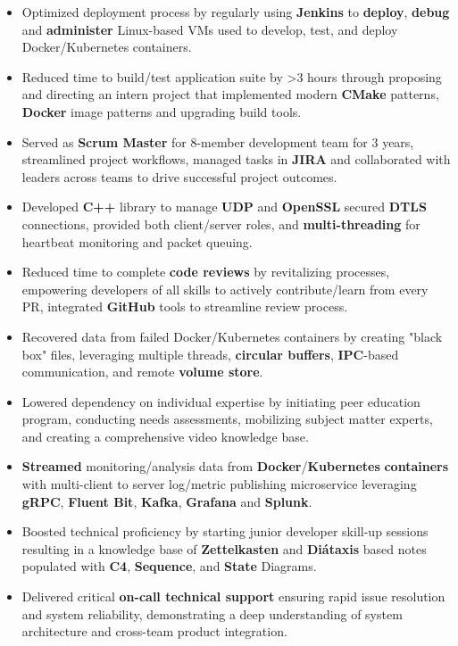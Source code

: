 \documentclass[a4paper]{article}
\begin{document}
\begin{itemize}
	\item Optimized deployment process by regularly using \textbf{Jenkins} to \textbf{deploy}, \textbf{debug} and \textbf{administer} Linux-based VMs used to develop, test, and deploy Docker/Kubernetes containers.
	\item Reduced time to build/test application suite by >3 hours through proposing and directing an intern project that implemented modern \textbf{CMake} patterns, \textbf{Docker} image patterns and upgrading build tools.
	\item Served as \textbf{Scrum Master} for 8-member development team for 3 years, streamlined project workflows, managed tasks in \textbf{JIRA} and collaborated with leaders across teams to drive successful project outcomes.
	\item Developed \textbf{C++} library to manage \textbf{UDP} and \textbf{OpenSSL} secured \textbf{DTLS} connections, provided both client/server roles, and \textbf{multi-threading} for heartbeat monitoring and packet queuing.
	\item Reduced time to complete \textbf{code reviews} by revitalizing processes, empowering developers of all skills to actively contribute/learn from every PR, integrated \textbf{GitHub} tools to streamline review process.
	\item Recovered data from failed Docker/Kubernetes containers by creating "black box" files, leveraging multiple threads, \textbf{circular buffers}, \textbf{IPC}-based communication, and remote \textbf{volume store}.
	\item Lowered dependency on individual expertise by initiating peer education program, conducting needs assessments, mobilizing subject matter experts, and creating a comprehensive video knowledge base.
	\item \textbf{Streamed} monitoring/analysis data from \textbf{Docker}/\textbf{Kubernetes} \textbf{containers} with multi-client to server log/metric publishing microservice leveraging \textbf{gRPC}, \textbf{Fluent Bit}, \textbf{Kafka}, \textbf{Grafana} and \textbf{Splunk}.
	\item Boosted technical proficiency by starting junior developer skill-up sessions resulting in a knowledge base of \textbf{Zettelkasten} and \textbf{Diátaxis} based notes populated with \textbf{C4}, \textbf{Sequence}, and \textbf{State} Diagrams.
	\item Delivered critical \textbf{on-call technical support} ensuring rapid issue resolution and system reliability, demonstrating a deep understanding of system architecture and cross-team product integration.

\end{itemize}
\end{document}
